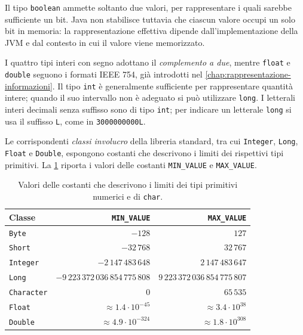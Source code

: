 Il tipo \texttt{boolean} ammette soltanto due valori, per
rappresentare i quali sarebbe sufficiente un bit. Java non
stabilisce tuttavia che ciascun valore occupi un solo bit
in memoria: la rappresentazione effettiva dipende
dall'implementazione della JVM e dal contesto in cui il
valore viene memorizzato.

I quattro tipi interi con segno adottano il
\emph{complemento a due}, mentre \texttt{float} e
\texttt{double} seguono i formati IEEE 754, già introdotti
nel \cref{chap:rappresentazione-informazioni}.
Il tipo \texttt{int} è generalmente sufficiente per
rappresentare quantità intere; quando il suo intervallo
non è adeguato si può utilizzare \texttt{long}. I letterali
interi decimali senza suffisso sono di tipo \texttt{int};
per indicare un letterale \texttt{long} si usa il suffisso
\texttt{L}, come in \texttt{3000000000L}.

Le corrispondenti \emph{classi involucro} della libreria
standard, tra cui \texttt{Integer}, \texttt{Long},
\texttt{Float} e \texttt{Double}, espongono costanti
che descrivono i limiti dei rispettivi tipi primitivi.
La \cref{tab:fi-java-limiti-primitivi} riporta i valori
delle costanti \texttt{MIN\_VALUE} e
\texttt{MAX\_VALUE}.

\begin{table}[htbp]
  \centering
  \small
  \begin{tabular}{lrr}
    \toprule
    Classe & \texttt{MIN\_VALUE} & \texttt{MAX\_VALUE} \\
    \midrule
    \texttt{Byte}
      & \(-128\)
      & \(127\) \\
    \texttt{Short}
      & \(-32\,768\)
      & \(32\,767\) \\
    \texttt{Integer}
      & \(-2\,147\,483\,648\)
      & \(2\,147\,483\,647\) \\
    \texttt{Long}
      & \(-9\,223\,372\,036\,854\,775\,808\)
      & \(9\,223\,372\,036\,854\,775\,807\) \\
    \texttt{Character}
      & \(0\)
      & \(65\,535\) \\
    \texttt{Float}
      & \(\approx 1.4\cdot10^{-45}\)
      & \(\approx 3.4\cdot10^{38}\) \\
    \texttt{Double}
      & \(\approx 4.9\cdot10^{-324}\)
      & \(\approx 1.8\cdot10^{308}\) \\
    \bottomrule
  \end{tabular}
  \caption{Valori delle costanti che descrivono i limiti
  dei tipi primitivi numerici e di \texttt{char}.}
  \label{tab:fi-java-limiti-primitivi}
\end{table}

